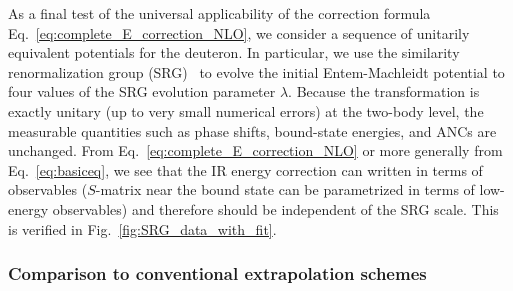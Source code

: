 	As a final test of the universal applicability of the correction
	formula Eq.~\eqref{eq:complete_E_correction_NLO}, we consider a sequence
	of unitarily equivalent	potentials for the deuteron.  In particular,
	we use the similarity renormalization group (SRG)~\cite{Bogner:2009bt}
	to evolve the initial Entem-Machleidt
	potential to four values of the SRG evolution parameter $\lambda$.
	Because the transformation is exactly unitary (up to very small
	numerical errors) at the two-body level, the measurable quantities
	such as phase shifts, bound-state energies, and ANCs are unchanged.
	From Eq.~\eqref{eq:complete_E_correction_NLO} or more generally from
	Eq.~\eqref{eq:basiceq}, we see that the IR energy correction can written
	in terms of observables ($S$-matrix near the bound state can be
	parametrized in terms of low-energy observables) and therefore should be
	independent of the SRG scale.  This is verified in
	Fig.~\ref{fig:SRG_data_with_fit}.



	\subsubsection{Comparison to conventional extrapolation schemes}

